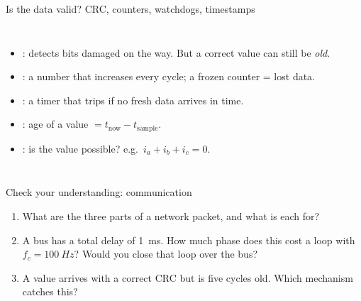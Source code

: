 \documentclass[aspectratio=169,10pt]{beamer}
\begin{document}
\begin{frame}{Is the data valid? CRC, counters, watchdogs, timestamps}
\begin{columns}[T]
\begin{itemize}\small
\item {}: detects bits damaged on the way. But a correct value can still be \emph{old}.
\item {}: a number that increases every cycle; a frozen counter = lost data.
\item {}: a timer that trips if no fresh data arrives in time.
\item {}: age of a value $=t_\text{now}-t_\text{sample}$.
\item {}: is the value possible? e.g.\ $i_a+i_b+i_c=0$.
\end{itemize}
\centering
{}
\end{columns}
\end{frame}

\begin{frame}{Check your understanding: communication}
\begin{keybox}
\large
\begin{enumerate}
\item What are the three parts of a network packet, and what is each for?
\item A bus has a total delay of \SI{1}{ms}. How much phase does this cost a loop with $f_c=\SI{100}{Hz}$? Would you close that loop over the bus?
\item A value arrives with a correct CRC but is five cycles old. Which mechanism catches this?
\end{enumerate}
\end{keybox}
\end{frame}
\end{document}

